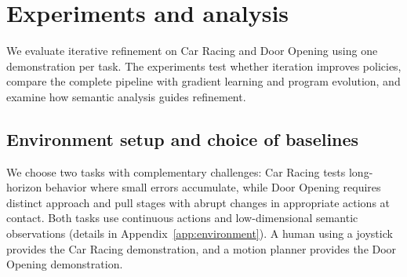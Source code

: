 \section{Experiments and analysis}
\label{sec:experiments}

We evaluate iterative refinement on Car Racing and Door Opening using one demonstration per task.
The experiments test whether iteration improves policies, compare the complete pipeline with gradient learning and program evolution, and examine how semantic analysis guides refinement.

\subsection{Environment setup and choice of baselines}
\label{sec:setup}

We choose two tasks with complementary challenges: Car Racing tests long-horizon behavior where small errors accumulate, while Door Opening requires distinct approach and pull stages with abrupt changes in appropriate actions at contact.
Both tasks use continuous actions and low-dimensional semantic observations (details in Appendix~\ref{app:environment}).
A human using a joystick provides the Car Racing demonstration, and a motion planner provides the Door Opening demonstration.

